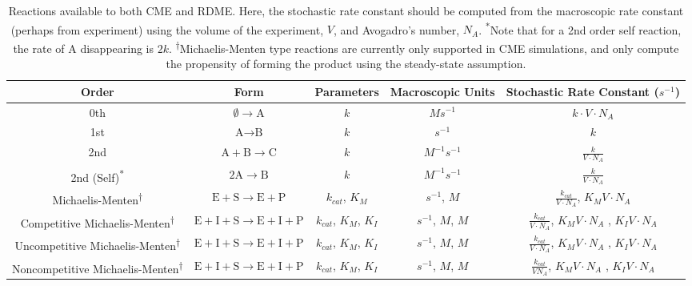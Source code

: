 \begin{sidewaystable}[htp]
\begin{center}
\begin{tabular}{|c|c|c|c|c|}
\hline
\textbf{Order} & \textbf{Form} & \textbf{Parameters} & \textbf{Macroscopic Units} & \textbf{Stochastic Rate Constant ($s^{-1}$)}\\
\hline\hline
0th  & $\emptyset \rightarrow \text{A}$   & $k$ & $Ms^{-1}$ & $k\cdot V \cdot N_A$\\
\hline
1st & $\text{A} \rightarrow \text{B}$ & $k$ & $s^{-1}$ & $k$ \\
\hline
2nd & $\text{A}+\text{B}\rightarrow \text{C}$ & $k$ & $M^{-1}s^{-1}$ & $\frac{k}{V\cdot N_A}$ \\
\hline
2nd (Self)\textsuperscript{*} & $2\text{A}\rightarrow\text{B}$ & $k$ & $M^{-1}s^{-1}$ & $\frac{k}{V\cdot N_A}$ \\
\hline
Michaelis-Menten\textsuperscript{$\dagger$} & $\text{E}+\text{S}\rightarrow\text{E}+\text{P}$ & $k_{cat}$, $K_{M}$ & $s^{-1}$, $M$ & $\frac{k_{cat}}{V\cdot N_A}$, $K_{M}V\cdot N_A$ \\ 
\hline
Competitive Michaelis-Menten\textsuperscript{$\dagger$} & $\text{E}+\text{I}+\text{S}\rightarrow\text{E}+\text{I}+\text{P}$ & $k_{cat}$, $K_{M}$, $K_{I}$ & $s^{-1}$, $M$, $M$ & $\frac{k_{cat}}{V\cdot N_A}$, $K_{M}V\cdot N_A$ , $K_{I}V\cdot N_A$\\ 
\hline
Uncompetitive Michaelis-Menten\textsuperscript{$\dagger$} & $\text{E}+\text{I}+\text{S}\rightarrow\text{E}+\text{I}+\text{P}$ & $k_{cat}$, $K_{M}$, $K_{I}$ & $s^{-1}$, $M$, $M$ & $\frac{k_{cat}}{V\cdot N_A}$, $K_{M}V\cdot N_A$ , $K_{I}V\cdot N_A$\\ 
\hline
Noncompetitive Michaelis-Menten\textsuperscript{$\dagger$} & $\text{E}+\text{I}+\text{S}\rightarrow\text{E}+\text{I}+\text{P}$ & $k_{cat}$, $K_{M}$, $K_{I}$ & $s^{-1}$, $M$, $M$ & $\frac{k_{cat}}{VN_A}$, $K_{M}V\cdot N_A$ , $K_{I}V\cdot N_A$\\ 
\hline
\end{tabular}
\end{center}
\caption{Reactions available to both CME and RDME.  Here, the stochastic rate constant should be computed from the macroscopic rate constant (perhaps from experiment) using the volume of the experiment, $V$, and Avogadro's number, $N_A$. \textsuperscript{*}Note that for a 2nd order self reaction, the rate of A disappearing is $2k$. \textsuperscript{$\dagger$}Michaelis-Menten type reactions are currently only supported in CME simulations, and only compute the propensity of forming the product using the steady-state assumption.} \label{tbl:rxnTypes}
\end{sidewaystable}%


